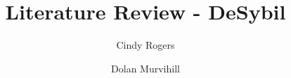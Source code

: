 \documentclass{article}
\begin{document}
\title{Literature Review - DeSybil}
\author{Cindy Rogers \and Dolan Murvihill}
\date{}

  
\end{document}
